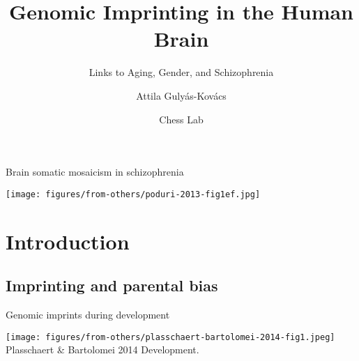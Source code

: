 \documentclass{beamer}
\title{Genomic Imprinting in the Human Brain}
\subtitle{Links to Aging, Gender, and Schizophrenia}
\author{Attila Guly\'{a}s-Kov\'{a}cs}
\date{Chess Lab}
\begin{document}
\begin{frame}[label=bsm]{Brain somatic mosaicism in schizophrenia}
\begin{center}
\texttt{[image: figures/from-others/poduri-2013-fig1ef.jpg]}
\end{center}
\end{frame}

\begin{frame}[plain, label=title]
\maketitle
\end{frame}

\begin{frame}[label=toc]
\tableofcontents
\end{frame}

\section{Introduction}
\subsection{Imprinting and parental bias}

\begin{frame}[label=imprint-mouse-devel]{Genomic imprints during development}
\begin{center}
\texttt{[image: figures/from-others/plasschaert-bartolomei-2014-fig1.jpeg]}
\vfill
{\tiny Plasschaert \& Bartolomei 2014 Development.}
\end{center}
\end{frame}
\end{document}
